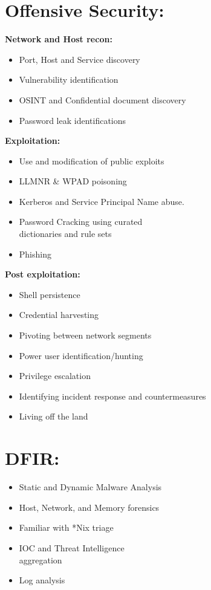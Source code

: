 \documentclass[a4paper,10pt]{article}
\begin{document}
\begin{multicols}{2}
\columnbreak

\section{Offensive Security:}

\textbf{Network and Host recon:}
\begin{itemize}[leftmargin=*]
    \item Port, Host and Service discovery
    \item Vulnerability identification
    \item OSINT and Confidential document discovery
    \item Password leak identifications
\end{itemize}


\textbf{Exploitation:}
\begin{itemize}[leftmargin=*]
    \item Use and modification of public exploits
    \item LLMNR \& WPAD poisoning
    \item Kerberos and Service Principal Name abuse.
    \item Password Cracking using curated \\ dictionaries and rule sets
    \item Phishing
\end{itemize}
        
\textbf{Post exploitation:}
\begin{itemize}[leftmargin=*]
    \item Shell persistence
    \item Credential harvesting
    \item Pivoting between network segments
    \item Power user identification/hunting
    \item Privilege escalation
    \item Identifying incident response and countermeasures
    \item Living off the land
\end{itemize}

\section{DFIR:}

\begin{itemize}[leftmargin=*]
    \item Static and Dynamic Malware Analysis
    \item Host, Network, and Memory forensics
    \item Familiar with *Nix triage
    \item IOC and Threat Intelligence \\ aggregation
    \item Log analysis
\end{itemize}

\end{multicols}
\end{document}
